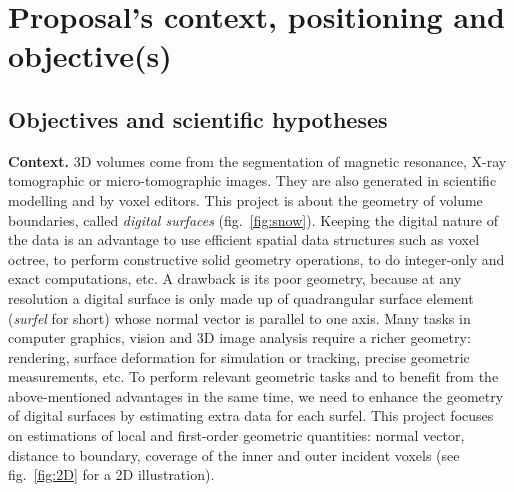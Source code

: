 \section{Proposal's context, positioning and objective(s)}
\label{sec:context}

\subsection{Objectives and scientific hypotheses}
\label{sec:goals}


\noindent\textbf{Context.}
3D volumes come from the segmentation of magnetic resonance, X-ray tomographic or micro-tomographic images. 
They are also generated in scientific modelling and by voxel editors. 
This project is about the geometry of volume boundaries, called \emph{digital surfaces} (fig.~\ref{fig:snow}). 
Keeping the digital nature of the data is an advantage
to use efficient spatial data structures such as voxel octree, 
to perform constructive solid geometry operations,
to do integer-only and exact computations, etc.
A drawback is its poor geometry, because at any resolution a digital surface is only 
made up of quadrangular surface element (\emph{surfel} for short) 
whose normal vector is parallel to one axis. 
Many tasks in computer graphics, vision and 3D image analysis require a richer geometry: 
rendering, surface deformation for simulation or tracking, precise geometric measurements, etc.
To perform relevant geometric tasks and 
to benefit from the above-mentioned advantages in the same time, 
we need to enhance the geometry of digital surfaces by estimating extra data for each surfel. 
This project focuses on estimations of local and first-order geometric quantities: 
normal vector, distance to boundary, coverage of the inner and outer incident voxels 
(see fig.~\ref{fig:2D} for a 2D illustration).  

